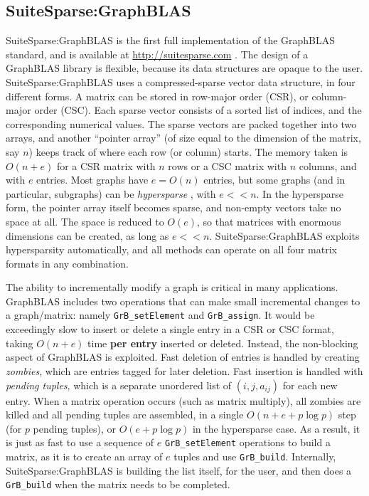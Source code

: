
\subsection{SuiteSparse:GraphBLAS}

SuiteSparse:GraphBLAS is the first full implementation of the GraphBLAS
standard, and is available at \url{http://suitesparse.com}
\cite{Davis19}.
%
The design of a GraphBLAS library is flexible, because its data structures are
opaque to the user.  SuiteSparse:GraphBLAS uses a compressed-sparse vector
data structure, in four different forms.  A matrix can be stored in
row-major order (CSR), or column-major order (CSC).  Each sparse vector
consists of a sorted list of indices, and the corresponding numerical values.
The sparse vectors are packed together into two arrays, and another ``pointer
array'' (of size equal to the dimension of the matrix, say $n$) keeps track of
where each row (or column) starts.  The memory taken is $O(n+e)$ for a CSR
matrix with $n$ rows or a CSC matrix with $n$ columns, and with $e$ entries.
Most graphs have $e=O(n)$ entries, but some graphs (and in particular,
subgraphs) can be {\em hypersparse} \cite{BulucGilbert08}, with $e << n$.  In
the hypersparse form, the pointer array itself becomes sparse, and non-empty
vectors take no space at all.  The space is reduced to $O(e)$, so that
matrices with enormous dimensions can be created, as long as $e << n$.
SuiteSparse:GraphBLAS exploits hypersparsity automatically, and all
methods can operate on all four matrix formats in any combination.

The ability to incrementally modify a graph is critical in many applications.
GraphBLAS includes two operations that can make small incremental changes to a
graph/matrix:  namely \verb'GrB_setElement' and \verb'GrB_assign'.  It would be
exceedingly slow to insert or delete a single entry in a CSR or CSC format,
taking $O(n+e)$ time {\bf per entry} inserted or deleted.  Instead, the
non-blocking aspect of GraphBLAS is exploited.  Fast deletion of entries is
handled by creating {\em zombies}, which are entries tagged for later deletion.
Fast insertion is handled with {\em pending tuples}, which is a separate
unordered list of $(i,j,a_{ij})$ for each new entry.  When a matrix operation
occurs (such as matrix multiply), all zombies are killed and all pending tuples
are assembled, in a single $O(n+ e + p \log p)$ step (for $p$ pending tuples),
or $O(e +p \log p)$ in the hypersparse case.  As a result, it is just as fast
to use a sequence of $e$ \verb'GrB_setElement' operations to build a matrix, as
it is to create an array of $e$ tuples and use \verb'GrB_build'.  Internally,
SuiteSparse:GraphBLAS is building the list itself, for the user, and then does
a \verb'GrB_build' when the matrix needs to be completed.

